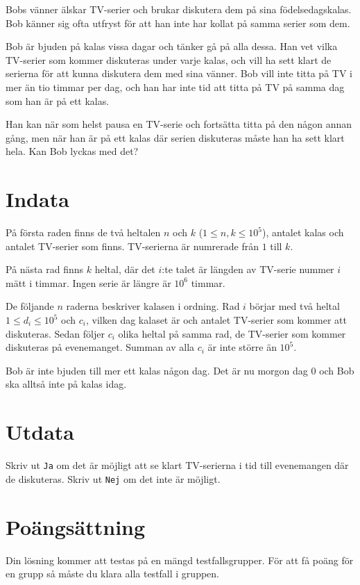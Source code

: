 Bobs vänner älskar TV-serier och brukar diskutera dem på sina födelsedagskalas. Bob känner sig ofta utfryst för att han inte har kollat på samma serier som dem.

Bob är bjuden på kalas vissa dagar och tänker gå på alla dessa. Han vet vilka TV-serier som kommer diskuteras under varje kalas, och vill ha sett klart de serierna för att kunna diskutera dem med sina vänner. Bob vill inte titta på TV i mer än tio timmar per dag, och han har inte tid att titta på TV på samma dag som han är på ett kalas.

Han kan när som helst pausa en TV-serie och fortsätta titta på den någon annan gång, men när han är på ett kalas där serien diskuteras måste han ha sett klart hela. Kan Bob lyckas med det?

\section*{Indata}
På första raden finns de två heltalen $n$ och $k$ ($1 \leq n,k \leq 10^5$), antalet kalas och antalet TV-serier som finns. TV-serierna är numrerade från $1$ till $k$.

På nästa rad finns $k$ heltal, där det $i$:te talet är längden av TV-serie nummer $i$ mätt i timmar. Ingen serie är längre är $10^6$ timmar.

De följande $n$ raderna beskriver kalasen i ordning. Rad $i$ börjar med två heltal $1 \leq d_i \leq 10^5$ och $c_i$, vilken dag kalaset är och antalet TV-serier som kommer att diskuteras. Sedan följer $c_i$ olika heltal på samma rad, de TV-serier som kommer diskuteras på evenemanget. Summan av alla $c_i$ är inte större än $10^5$.

Bob är inte bjuden till mer ett kalas någon dag. Det är nu morgon dag $0$ och Bob ska alltså inte på kalas idag.

\section*{Utdata}
Skriv ut \texttt{Ja} om det är möjligt att se klart TV-serierna i tid till evenemangen där de diskuteras. Skriv ut \texttt{Nej} om det inte är möjligt.

\section*{Poängsättning}
Din lösning kommer att testas på en mängd testfallsgrupper.
För att få poäng för en grupp så måste du klara alla testfall i gruppen.

